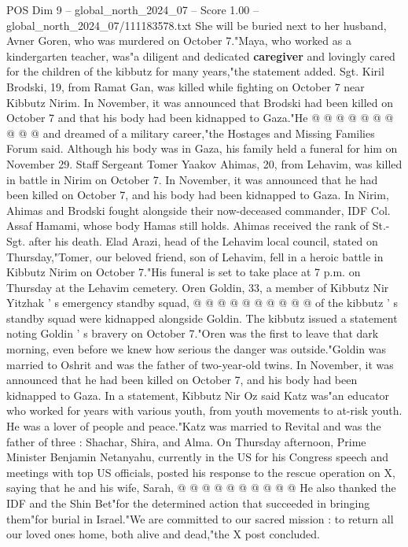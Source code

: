 \begin{textsample}{POS Dim 9 – global\_north\_2024\_07 – Score 1.00 – global\_north\_2024\_07/111183578.txt}
She will be buried next to her husband, Avner Goren, who was murdered on October 7."Maya, who worked as a kindergarten teacher, was"a diligent and dedicated \textbf{caregiver} and lovingly cared for the children of the kibbutz for many years,"the statement added.
Sgt.
Kiril Brodski, 19, from Ramat Gan, was killed while fighting on October 7 near Kibbutz Nirim.
In November, it was announced that Brodski had been killed on October 7 and that his body had been kidnapped to Gaza."He @ @ @ @ @ @ @ @ @ @ and dreamed of a military career,"the Hostages and Missing Families Forum said.
Although his body was in Gaza, his family held a funeral for him on November 29.
Staff Sergeant Tomer Yaakov Ahimas, 20, from Lehavim, was killed in battle in Nirim on October 7.
In November, it was announced that he had been killed on October 7, and his body had been kidnapped to Gaza.
In Nirim, Ahimas and Brodski fought alongside their now-deceased commander, IDF Col.
Assaf Hamami, whose body Hamas still holds.
Ahimas received the rank of St.-Sgt. after his death.
Elad Arazi, head of the Lehavim local council, stated on Thursday,"Tomer, our beloved friend, son of Lehavim, fell in a heroic battle in Kibbutz Nirim on October 7."His funeral is set to take place at 7 p.m. on Thursday at the Lehavim cemetery.
Oren Goldin, 33, a member of Kibbutz Nir Yitzhak ' s emergency standby squad, @ @ @ @ @ @ @ @ @ @ of the kibbutz ' s standby squad were kidnapped alongside Goldin.
The kibbutz issued a statement noting Goldin ' s bravery on October 7."Oren was the first to leave that dark morning, even before we knew how serious the danger was outside."Goldin was married to Oshrit and was the father of two-year-old twins.
In November, it was announced that he had been killed on October 7, and his body had been kidnapped to Gaza.
In a statement, Kibbutz Nir Oz said Katz was"an educator who worked for years with various youth, from youth movements to at-risk youth.
He was a lover of people and peace."Katz was married to Revital and was the father of three : Shachar, Shira, and Alma.
On Thursday afternoon, Prime Minister Benjamin Netanyahu, currently in the US for his Congress speech and meetings with top US officials, posted his response to the rescue operation on X, saying that he and his wife, Sarah, @ @ @ @ @ @ @ @ @ @ He also thanked the IDF and the Shin Bet"for the determined action that succeeded in bringing them"for burial in Israel."We are committed to our sacred mission : to return all our loved ones home, both alive and dead,"the X post concluded.

\end{textsample}
